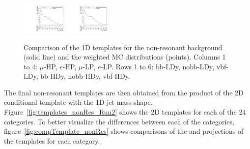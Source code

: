 \begin{figure}[htbp]
  \includegraphics[width=0.2\textwidth]{fig/2Dfit/templateVsReco_nonRes_r0_MJ_mu_LP_vbf_HDy.pdf}
  \includegraphics[width=0.2\textwidth]{fig/2Dfit/templateVsReco_nonRes_r0_MJ_e_LP_vbf_HDy.pdf}\\
  \caption{
    Comparison of the 1D \MJ templates for the non-resonant background (solid line) and the weighted MC distributions (points).
    Columns 1 to 4: $\mu$-HP, $e$-HP, $\mu$-LP, $e$-LP.
    Rows 1 to 6: bb-LDy, nobb-LDy, vbf-LDy, bb-HDy, nobb-HDy, vbf-HDy.
  }
  \label{fig:1dtemplateVsReco_nonRes_MJ_Run2}
\end{figure}

The final non-resonant templates are then obtained from the product of the 2D conditional template with the 1D jet mass shape.
Figure~\ref{fig:templates_nonRes_Run2} shows the 2D templates for each of the 24 categories.
To better visualize the differences between each of the categories, figure~\ref{fig:compTemplate_nonRes} shows comparisons of the \MVV and \MJ projections of the templates for each category.


